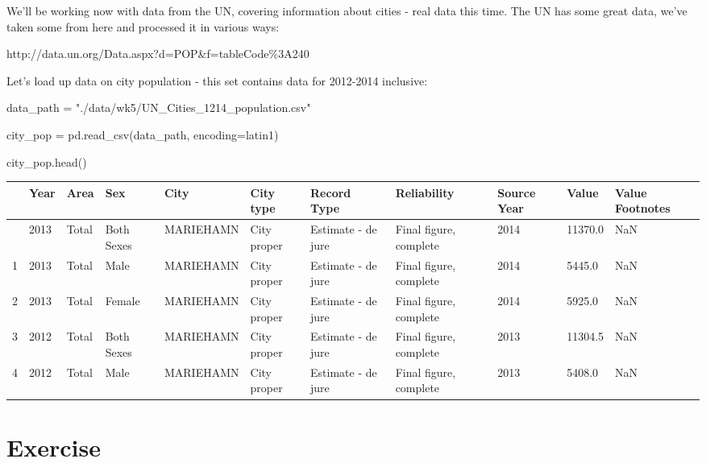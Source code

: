 \documentclass[
  letterpaper,
  DIV=11,
  numbers=noendperiod]{scrreprt}
\newenvironment{Shaded}{\begin{snugshade}}{\end{snugshade}}
\newcommand{\NormalTok}[1]{\textcolor[rgb]{0.00,0.23,0.31}{#1}}
\newcommand{\OperatorTok}[1]{\textcolor[rgb]{0.37,0.37,0.37}{#1}}
\newcommand{\StringTok}[1]{\textcolor[rgb]{0.13,0.47,0.30}{#1}}
\begin{document}
We'll be working now with data from the UN, covering information about
cities - real data this time. The UN has some great data, we've taken
some from here and processed it in various ways:

http://data.un.org/Data.aspx?d=POP\&f=tableCode\%3A240

Let's load up data on city population - this set contains data for
2012-2014 inclusive:

\begin{Shaded}
\begin{Highlighting}[]
\NormalTok{data\_path }\OperatorTok{=} \StringTok{"./data/wk5/UN\_Cities\_1214\_population.csv"}

\NormalTok{city\_pop }\OperatorTok{=}\NormalTok{ pd.read\_csv(data\_path, encoding}\OperatorTok{=}\StringTok{\textquotesingle{}latin1\textquotesingle{}}\NormalTok{)}
\end{Highlighting}
\end{Shaded}

\begin{Shaded}
\begin{Highlighting}[]
\NormalTok{city\_pop.head()}
\end{Highlighting}
\end{Shaded}

\begin{longtable}[]{@{}lllllllllll@{}}
\toprule\noalign{}
& Year & Area & Sex & City & City type & Record Type & Reliability &
Source Year & Value & Value Footnotes \\
\midrule\noalign{}
\endhead
\bottomrule\noalign{}
\endlastfoot
0 & 2013 & Total & Both Sexes & MARIEHAMN & City proper & Estimate - de
jure & Final figure, complete & 2014 & 11370.0 & NaN \\
1 & 2013 & Total & Male & MARIEHAMN & City proper & Estimate - de jure &
Final figure, complete & 2014 & 5445.0 & NaN \\
2 & 2013 & Total & Female & MARIEHAMN & City proper & Estimate - de jure
& Final figure, complete & 2014 & 5925.0 & NaN \\
3 & 2012 & Total & Both Sexes & MARIEHAMN & City proper & Estimate - de
jure & Final figure, complete & 2013 & 11304.5 & NaN \\
4 & 2012 & Total & Male & MARIEHAMN & City proper & Estimate - de jure &
Final figure, complete & 2013 & 5408.0 & NaN \\
\end{longtable}

\hypertarget{exercise-15}{%
\section{Exercise}\label{exercise-15}}
\end{document}
